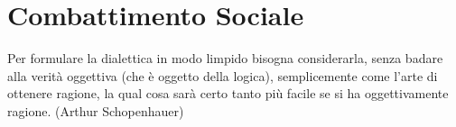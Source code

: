 \section{Combattimento Sociale}

\begin{changemargin}{0.3cm}{0.3cm}\begin{enfasi}{

Per formulare la dialettica in modo limpido bisogna considerarla, senza badare alla verità oggettiva (che è oggetto della logica), semplicemente come l'arte di ottenere ragione, la qual cosa sarà certo tanto più facile se si ha oggettivamente ragione. (Arthur Schopenhauer)

}\end{enfasi}\end{changemargin}

